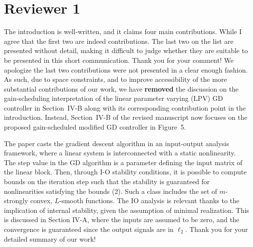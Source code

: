 \section*{Reviewer 1}\label{sec:reviewer1}
\renewcommand{\theequation}{R1.\arabic{equation}}
\setcounter{equation}{0}
\begin{rebuttal}
    {%
        The introduction is well-written, and it claims four main contributions. While I agree that the first two are indeed contributions. The last two on the list are presented without detail, making it difficult to judge whether they are suitable to be presented in this short communication.
    }%
    {%
        Thank you for your comment! We apologize the last two contributions were not presented in a clear enough fashion. As such, due to space constraints, and to improve accessibility of the more substantial contributions of our work, we have \textbf{removed} the discussion on the gain-scheduling interpretation of the linear parameter varying (LPV) GD controller in Section~IV-B along with its corresponding contribution point in the introduction. Instead, Section~IV-B of the revised manuscript now focuses on the proposed gain-scheduled modified GD controller in Figure~5.
    }%
\end{rebuttal}
\begin{rebuttal}
    {%
        The paper casts the gradient descent algorithm in an input-output analysis framework, where a linear system is interconnected with a static nonlinearity. The step value in the GD algorithm is a parameter defining the input matrix of the linear block. Then, through I-O stability conditions, it is possible to compute bounds on the iteration step such that the stability is guaranteed for nonlinearities satisfying the bounds (2). Such a class includes the set of $m$-strongly convex, $L$-smooth functions. The IO analysis is relevant thanks to the implication of internal stability, given the assumption of minimal realization. This is discussed in Section IV-A, where the inputs are assumed to be zero, and the convergence is guaranteed since the output signals are in \(\ell_2\).
    }%
    {%
        Thank you for your detailed summary of our work!
    }%
\end{rebuttal}
